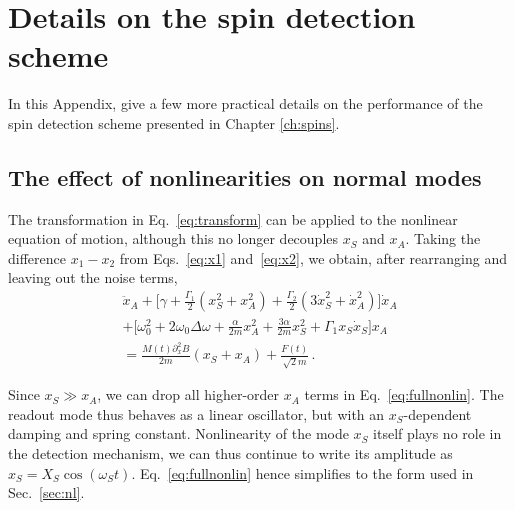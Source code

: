 
\chapter{Details on the spin detection scheme} \label{app:spins_expt}

In this Appendix, give a few more practical details on the performance of the spin detection scheme presented in Chapter \ref{ch:spins}. 

\section{The effect of nonlinearities on normal modes}
\label{app:nonlin}

The transformation in Eq.~\eqref{eq:transform} can be applied to the nonlinear equation of motion, although this no longer decouples $x_S$ and $x_A$. Taking the difference $x_1 - x_2$ from Eqs.~\eqref{eq:x1} and~\eqref{eq:x2}, we obtain, after rearranging and leaving out the noise terms,
\begin{multline} \label{eq:fullnonlin}
\ddot{x}_A + \bigg[\gamma + \frac{\Gamma_1}{2} (x_S^2 + x_A^2) + \frac{\Gamma_2}{2} (3 \dot{x}_S^2 + \dot{x}_A^2)\bigg] \dot{x}_A \\ 
+ \bigg[\omega_0^2 + 2 \omega_0 \Delta \omega + \frac{\alpha}{2 m} x_A^2 + \frac{3 \alpha}{2 m} x_S^2 + \Gamma_1 x_S \dot{x}_S \bigg] x_A  \\ 
= \frac{M(t) \partial_x^2 B}{2 m} (x_S + x_A) + \frac{F(t)}{\sqrt{2} m}\,.
\end{multline}

Since $x_S \gg x_A$, we can drop all higher-order $x_A$ terms in Eq.~\eqref{eq:fullnonlin}. The readout mode thus behaves as a linear oscillator, but with an $x_S$-dependent damping and spring constant. Nonlinearity of the mode $x_S$ itself plays no role in the detection mechanism, we can thus continue to write its amplitude as $x_S = X_S \cos(\omega_S t)$. Eq.~\eqref{eq:fullnonlin} hence simplifies to the form used in Sec.~\ref{sec:nl}.

